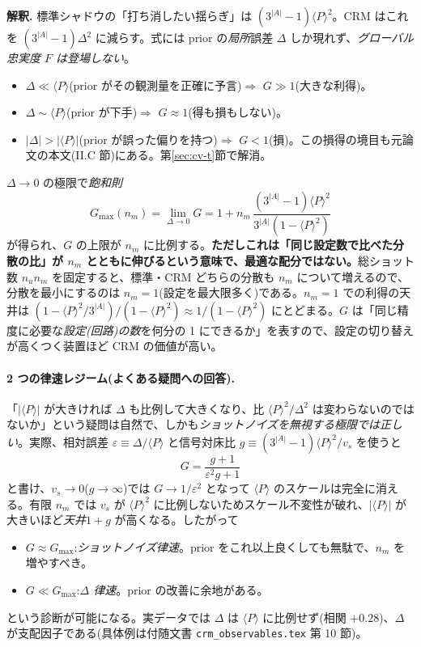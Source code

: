 \documentclass[11pt,a4paper]{ltjsarticle}
\newcommand{\ev}[1]{\langle #1\rangle}
\begin{document}
\begin{keybox}
\textbf{解釈.} 標準シャドウの「打ち消したい揺らぎ」は $(3^{|A|}-1)\ev{P}^2$。CRM はこれを $(3^{|A|}-1)\Delta^2$ に減らす。式には prior の\emph{局所}誤差 $\Delta$ しか現れず、\emph{グローバル忠実度 $F$ は登場しない}。
\begin{itemize}
  \item $\Delta\ll\ev{P}$(prior がその観測量を正確に予言)$\Rightarrow$ $G\gg1$(大きな利得)。
  \item $\Delta\sim\ev{P}$(prior が下手)$\Rightarrow$ $G\approx1$(得も損もしない)。
  \item $|\Delta|>|\ev{P}|$(prior が誤った偏りを持つ)$\Rightarrow$ $G<1$(損)。この損得の境目も元論文の本文(II.C 節)にある。第\ref{sec:cv-t}節で解消。
\end{itemize}
$\Delta\to0$ の極限で\emph{飽和則}
\begin{equation}
  G_{\max}(n_m)=\lim_{\Delta\to0}G = 1 + n_m\,\frac{(3^{|A|}-1)\ev{P}^2}{3^{|A|}(1-\ev{P}^2)}
  \label{eq:sat-t}
\end{equation}
が得られ、$G$ の上限が $n_m$ に比例する。\textbf{ただしこれは「同じ設定数で比べた分散の比」が $n_m$ とともに伸びるという意味で、最適な配分ではない。}総ショット数 $n_u n_m$ を固定すると、標準・CRM どちらの分散も $n_m$ について増えるので、分散を最小にするのは $n_m=1$(設定を最大限多く)である。$n_m=1$ での利得の天井は $(1-\ev{P}^2/3^{|A|})/(1-\ev{P}^2)\approx1/(1-\ev{P}^2)$ にとどまる。$G$ は「同じ精度に必要な\emph{設定(回路)の数}を何分の 1 にできるか」を表すので、設定の切り替えが高くつく装置ほど CRM の価値が高い。
\end{keybox}

\paragraph{2 つの律速レジーム(よくある疑問への回答).}「$|\ev{P}|$ が大きければ $\Delta$ も比例して大きくなり、比 $\ev{P}^2/\Delta^2$ は変わらないのではないか」という疑問は自然で、しかも\emph{ショットノイズを無視する極限では正しい}。実際、相対誤差 $\varepsilon\equiv\Delta/\ev{P}$ と信号対床比 $g\equiv(3^{|A|}-1)\ev{P}^2/v_s$ を使うと
\begin{equation}
  G = \frac{g+1}{\varepsilon^2 g+1}
  \label{eq:tworegime}
\end{equation}
と書け、$v_s\to0$($g\to\infty$)では $G\to1/\varepsilon^2$ となって $\ev{P}$ のスケールは完全に消える。有限 $n_m$ では $v_s$ が $\ev{P}^2$ に比例しないためスケール不変性が破れ、$|\ev{P}|$ が大きいほど\emph{天井}$1+g$ が高くなる。したがって
\begin{itemize}
  \item $G\approx G_{\max}$:\emph{ショットノイズ律速}。prior をこれ以上良くしても無駄で、$n_m$ を増やすべき。
  \item $G\ll G_{\max}$:\emph{$\Delta$ 律速}。prior の改善に余地がある。
\end{itemize}
という診断が可能になる。実データでは $\Delta$ は $\ev{P}$ に比例せず(相関 $+0.28$)、$\Delta$ が支配因子である(具体例は付随文書 \texttt{crm\_observables.tex} 第 10 節)。
\end{document}
